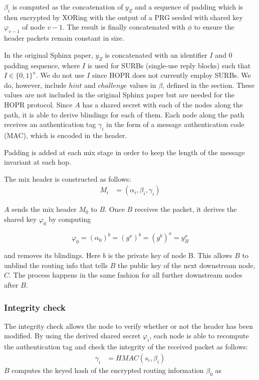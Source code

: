 $\beta_i$ is computed as the concatenation of $y_Z$ and a sequence of padding which is then encrypted by XORing with the output of a PRG seeded with shared key $\varphi_{v-1}$ of node $v-1$. The result is finally concatenated with $\phi$ to ensure the header packets remain constant in size.

In the original Sphinx paper, $y_Z$ is concatenated with an identifier $I$ and $0$ padding sequence, where $I$ is used for SURBs (single-use reply blocks) such that $I \in \{0, 1\}^\kappa$. We do not use $I$ since HOPR does not currently employ SURBs. We do, however, include $hint$ and $challenge$ values in $\beta$, defined in the  section. These values are not included in the original Sphinx paper but are needed for the HOPR protocol. Since $A$ has a shared secret with each of the nodes along the path, it is able to derive blindings for each of them. Each node along the path receives an authentication tag $\gamma_i$ in the form of a message authentication code (MAC), which is encoded in the header.

Padding is added at each mix stage in order to keep the length of the message invariant at each hop.

The mix header is constructed as follows:
\begin{align}
    M_i & =(\alpha_i,\beta_i,\gamma_i)
\end{align}

$A$ sends the mix header $M_0$ to $B$. Once $B$ receives the packet, it derives the shared key $\varphi_0$ by computing

$$\varphi_0=(\alpha_0)^b=(g^x)^b=(g^b)^x=y^x_B$$

and removes its blindings. Here $b$ is the private key of node B. This allows $B$ to unblind the routing info that tells $B$ the public key of the next downstream node, $C$. The process happens in the same fashion for all further downstream nodes after $B$.

\subsubsection{Integrity check}
The integrity check allows the node to verify whether or not the header has been modified. By using the derived shared secret $\varphi_i$, each node is able to recompute the authentication tag and check the integrity of the received packet as follows:
\begin{align}
    \gamma_i & =HMAC(s_i,\beta_i)
    \label{eq:6}
\end{align}
$B$ computes the keyed hash of the encrypted routing information $\beta_0$ as

